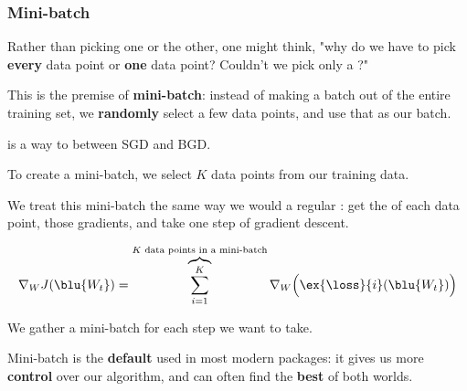         \subsubsection{Mini-batch}
        
            Rather than picking one or the other, one might think, "why do we have to pick \textbf{every} data point or \textbf{one} data point? Couldn't we pick only a ?"
            
            This is the premise of \textbf{mini-batch}: instead of making a batch out of the entire training set, we \textbf{randomly} select a few data points, and use that as our batch.\\
            
            \begin{definition}
                 is a way to  between SGD and BGD.
                
                To create a mini-batch, we  select $K$ data points from our training data. 
                
                We treat this mini-batch the same way we would a regular : get the  of each data point,  those gradients, and take one  step of gradient descent.
                
                \begin{equation*}
                    \nabla_W J ( \blu{ W_t } )
                    =
                    \overbrace{
                        \sum_{i=1}^K
                    }^{K \text{ data points in a mini-batch}} 
                    \nabla_W
                    \Big(
                        \ex{\loss}{i}(\blu{ W_t })
                    \Big)
                \end{equation*}
                
                We gather a  mini-batch for each step we want to take.
            \end{definition}
            
            Mini-batch is the \textbf{default} used in most modern packages: it gives us more \textbf{control} over our algorithm, and can often find the \textbf{best} of both worlds.
                \\
            
